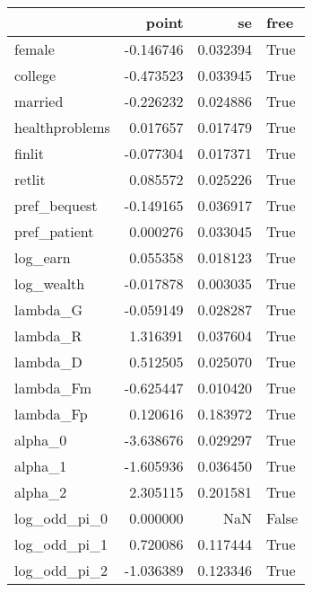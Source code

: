 \begin{tabular}{lrrl}
\toprule
{} &     point &        se &   free \\
\midrule
female         & -0.146746 &  0.032394 &   True \\
college        & -0.473523 &  0.033945 &   True \\
married        & -0.226232 &  0.024886 &   True \\
healthproblems &  0.017657 &  0.017479 &   True \\
finlit         & -0.077304 &  0.017371 &   True \\
retlit         &  0.085572 &  0.025226 &   True \\
pref\_bequest   & -0.149165 &  0.036917 &   True \\
pref\_patient   &  0.000276 &  0.033045 &   True \\
log\_earn       &  0.055358 &  0.018123 &   True \\
log\_wealth     & -0.017878 &  0.003035 &   True \\
lambda\_G       & -0.059149 &  0.028287 &   True \\
lambda\_R       &  1.316391 &  0.037604 &   True \\
lambda\_D       &  0.512505 &  0.025070 &   True \\
lambda\_Fm      & -0.625447 &  0.010420 &   True \\
lambda\_Fp      &  0.120616 &  0.183972 &   True \\
alpha\_0        & -3.638676 &  0.029297 &   True \\
alpha\_1        & -1.605936 &  0.036450 &   True \\
alpha\_2        &  2.305115 &  0.201581 &   True \\
log\_odd\_pi\_0   &  0.000000 &       NaN &  False \\
log\_odd\_pi\_1   &  0.720086 &  0.117444 &   True \\
log\_odd\_pi\_2   & -1.036389 &  0.123346 &   True \\
\bottomrule
\end{tabular}
